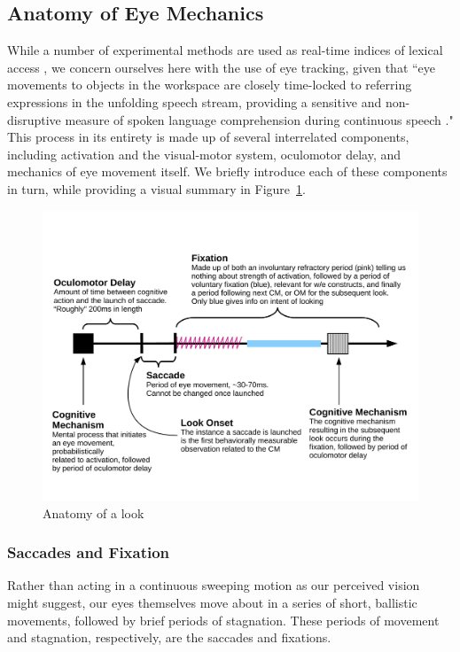 \documentclass{article}
\begin{document}
\subsection{Anatomy of Eye Mechanics}

While a number of experimental methods are used as real-time indices of lexical access \citep{Spivey2005}, we concern ourselves here with the use of eye tracking, given that ``eye movements to objects in the workspace are closely time-locked to referring expressions in the unfolding speech stream, providing a sensitive and non-disruptive measure of spoken language comprehension during continuous speech \citep{allopenna1998tracking}." This process in its entirety is made up of several interrelated components, including activation and the visual-motor system, oculomotor delay, and mechanics of eye movement itself. We briefly introduce each of these components in turn, while providing a visual summary in Figure~\ref{fig:whats_in_a_look}.

\begin{figure}[H]
\centering
\includegraphics[scale=0.5]{what_is_a_look.pdf}
\caption{Anatomy of a look} 
\label{fig:whats_in_a_look}
\end{figure}

\subsubsection{Saccades and Fixation}

Rather than acting in a continuous sweeping motion as our perceived vision might suggest, our eyes themselves move about in a series of short, ballistic movements, followed by brief periods of stagnation. These periods of movement and stagnation, respectively, are the saccades and fixations. 
\end{document}
